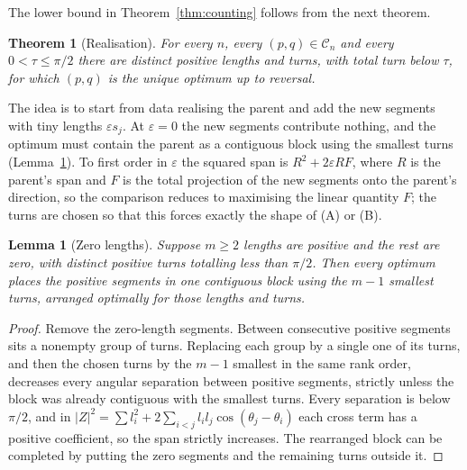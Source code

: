 \documentclass[11pt]{article}
\newtheorem{theorem}{Theorem}
\newtheorem{lemma}{Lemma}[section]
\theoremstyle{remark}
\newcommand{\cC}{\mathcal C}
\begin{document}
The lower bound in Theorem~\ref{thm:counting} follows from the next theorem.

\begin{theorem}[Realisation]\label{thm:realise}
For every $n$, every $(p,q)\in\cC_n$ and every $0<\tau\le\pi/2$ there are distinct positive lengths and turns, with total turn below $\tau$, for which $(p,q)$ is the unique optimum up to reversal.
\end{theorem}

The idea is to start from data realising the parent and add the new segments with tiny lengths $\varepsilon s_j$. At $\varepsilon=0$ the new segments contribute nothing, and the optimum must contain the parent as a contiguous block using the smallest turns (Lemma~\ref{lem:zero}). To first order in $\varepsilon$ the squared span is $R^2+2\varepsilon RF$, where $R$ is the parent's span and $F$ is the total projection of the new segments onto the parent's direction, so the comparison reduces to maximising the linear quantity $F$; the turns are chosen so that this forces exactly the shape of (A) or (B).

\begin{lemma}[Zero lengths]\label{lem:zero}
Suppose $m\ge2$ lengths are positive and the rest are zero, with distinct positive turns totalling less than $\pi/2$. Then every optimum places the positive segments in one contiguous block using the $m-1$ smallest turns, arranged optimally for those lengths and turns.
\end{lemma}

\begin{proof}
Remove the zero-length segments. Between consecutive positive segments sits a nonempty group of turns. Replacing each group by a single one of its turns, and then the chosen turns by the $m-1$ smallest in the same rank order, decreases every angular separation between positive segments, strictly unless the block was already contiguous with the smallest turns. Every separation is below $\pi/2$, and in $|Z|^2=\sum l_i^2+2\sum_{i<j}l_il_j\cos(\theta_j-\theta_i)$ each cross term has a positive coefficient, so the span strictly increases. The rearranged block can be completed by putting the zero segments and the remaining turns outside it.
\end{proof}
\end{document}
